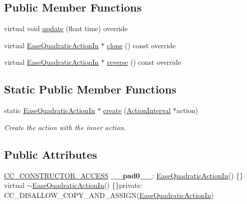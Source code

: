 \subsection*{Public Member Functions}
\begin{DoxyCompactItemize}
\item 
virtual void \hyperlink{classEaseQuadraticActionIn_ac773c27eef9d3d90ae1021d75ad25301}{update} (float time) override
\item 
virtual \hyperlink{classEaseQuadraticActionIn}{Ease\+Quadratic\+Action\+In} $\ast$ \hyperlink{classEaseQuadraticActionIn_a2e61f6edb0accd7573d55784d1ca508a}{clone} () const override
\item 
virtual \hyperlink{classEaseQuadraticActionIn}{Ease\+Quadratic\+Action\+In} $\ast$ \hyperlink{classEaseQuadraticActionIn_ab6115c4fb960331b561bb6eeadf81616}{reverse} () const override
\end{DoxyCompactItemize}
\subsection*{Static Public Member Functions}
\begin{DoxyCompactItemize}
\item 
static \hyperlink{classEaseQuadraticActionIn}{Ease\+Quadratic\+Action\+In} $\ast$ \hyperlink{classEaseQuadraticActionIn_a08692641f85cdd99f21d2d9286522f2b}{create} (\hyperlink{classActionInterval}{Action\+Interval} $\ast$action)
\begin{DoxyCompactList}\small\item\em Create the action with the inner action. \end{DoxyCompactList}\end{DoxyCompactItemize}
\subsection*{Public Attributes}
\begin{DoxyCompactItemize}
\item 
\mbox{\label{classEaseQuadraticActionIn_a9d6e2266189972cee896e80b463eca2e}} 
\hyperlink{_2cocos2d_2cocos_2base_2ccConfig_8h_a25ef1314f97c35a2ed3d029b0ead6da0}{C\+C\+\_\+\+C\+O\+N\+S\+T\+R\+U\+C\+T\+O\+R\+\_\+\+A\+C\+C\+E\+SS} {\bfseries \+\_\+\+\_\+pad0\+\_\+\+\_\+}\+: \hyperlink{classEaseQuadraticActionIn}{Ease\+Quadratic\+Action\+In}() \{\} virtual $\sim$\hyperlink{classEaseQuadraticActionIn}{Ease\+Quadratic\+Action\+In}() \{\}private\+: C\+C\+\_\+\+D\+I\+S\+A\+L\+L\+O\+W\+\_\+\+C\+O\+P\+Y\+\_\+\+A\+N\+D\+\_\+\+A\+S\+S\+I\+GN(\hyperlink{classEaseQuadraticActionIn}{Ease\+Quadratic\+Action\+In})
\end{DoxyCompactItemize}
